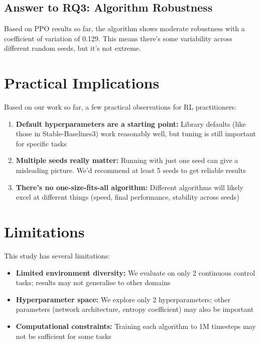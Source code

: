 \documentclass[12pt,a4paper]{report}
\begin{document}
\subsection{Answer to RQ3: Algorithm Robustness}

Based on PPO results so far, the algorithm shows moderate robustness with a coefficient of variation of 0.129. This means there's some variability across different random seeds, but it's not extreme.



\section{Practical Implications}

Based on our work so far, a few practical observations for RL practitioners:

\begin{enumerate}
    \item \textbf{Default hyperparameters are a starting point:} Library defaults (like those in Stable-Baselines3) work reasonably well, but tuning is still important for specific tasks
    \item \textbf{Multiple seeds really matter:} Running with just one seed can give a misleading picture. We'd recommend at least 5 seeds to get reliable results
    \item \textbf{There's no one-size-fits-all algorithm:} Different algorithms will likely excel at different things (speed, final performance, stability across seeds)
\end{enumerate}



\section{Limitations}

This study has several limitations:

\begin{itemize}
    \item \textbf{Limited environment diversity:} We evaluate on only 2 continuous control tasks; results may not generalise to other domains
    \item \textbf{Hyperparameter space:} We explore only 2 hyperparameters; other parameters (network architecture, entropy coefficient) may also be important
    \item \textbf{Computational constraints:} Training each algorithm to 1M timesteps may not be sufficient for some tasks
\end{itemize}
\end{document}
